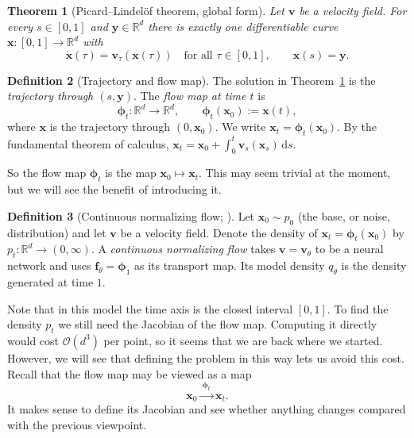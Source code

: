 \documentclass[11pt,a4paper]{article}
\numberwithin{equation}{section}     %
\theoremstyle{plain}        %
\newtheorem{theorem}{Theorem}[section]
\theoremstyle{definition}   %
\newtheorem{definition}[theorem]{Definition}
\theoremstyle{remark}       %
\begin{document}
\begin{theorem}[Picard--Lindel\"of theorem, global form]\label{thm:pl}
Let $\mathbf{v}$ be a velocity field. For every $s\in[0,1]$ and $\mathbf{y}\in\mathbb{R}^d$ there is exactly one differentiable curve $\mathbf{x}:[0,1]\to\mathbb{R}^d$ with
\[
\dot{\mathbf{x}}(\tau)=\mathbf{v}_\tau(\mathbf{x}(\tau))\quad\text{for all }\tau\in[0,1],\qquad\mathbf{x}(s)=\mathbf{y} .
\]
\end{theorem}

\begin{definition}[Trajectory and flow map]\label{def:flowmap}
The solution in Theorem~\ref{thm:pl} is the \emph{trajectory through $(s,\mathbf{y})$}. The \emph{flow map at time $t$} is
\[
\boldsymbol{\phi}_t:\mathbb{R}^d\to\mathbb{R}^d,\qquad\boldsymbol{\phi}_t(\mathbf{x}_0):=\mathbf{x}(t),
\]
where $\mathbf{x}$ is the trajectory through $(0,\mathbf{x}_0)$. We write $\mathbf{x}_t=\boldsymbol{\phi}_t(\mathbf{x}_0)$. By the fundamental theorem of calculus, $\mathbf{x}_t=\mathbf{x}_0+\int_0^t\mathbf{v}_s(\mathbf{x}_s)\,\mathrm{d}s$.
\end{definition}

So the flow map $\boldsymbol{\phi}_t$ is the map $\mathbf{x}_0\mapsto\mathbf{x}_t$. This may seem trivial at the moment, but we will see the benefit of introducing it.

\begin{definition}[Continuous normalizing flow; \citealp{chen2018}]\label{def:cnf}
Let $\mathbf{x}_0\sim p_0$ (the base, or noise, distribution) and let $\mathbf{v}$ be a velocity field. Denote the density of $\mathbf{x}_t=\boldsymbol{\phi}_t(\mathbf{x}_0)$ by $p_t:\mathbb{R}^d\to(0,\infty)$. A \emph{continuous normalizing flow} takes $\mathbf{v}=\mathbf{v}_\theta$ to be a neural network and uses $\mathbf{f}_\theta=\boldsymbol{\phi}_1$ as its transport map. Its model density $q_\theta$ is the density generated at time $1$.
\end{definition}

Note that in this model the time axis is the closed interval $[0,1]$. To find the density $p_t$ we still need the Jacobian of the flow map. Computing it directly would cost $\mathcal{O}(d^3)$ per point, so it seems that we are back where we started. However, we will see that defining the problem in this way lets us avoid this cost. Recall that the flow map may be viewed as a map
\[
\mathbf{x}_0\xrightarrow{\ \boldsymbol{\phi}_t\ }\mathbf{x}_t .
\]
It makes sense to define its Jacobian and see whether anything changes compared with the previous viewpoint.
\end{document}
